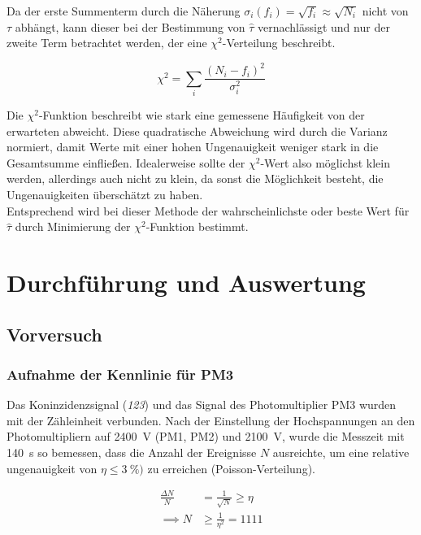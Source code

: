 \documentclass[slug=LM, room=Andreas-Schubert-Bau\,\ K\ 1A, supervisor=Anne-Sophie\ Berthold, coursedate=13.\ 12.\ 2019]{../../Lab_Report_LaTeX/lab_report}
\begin{document}
Da der erste Summenterm durch die Näherung \(\sigma_i(f_i) = \sqrt{f_i} \approx \sqrt{N_i}\) nicht
von \(\tau\) abhängt, kann dieser bei der Bestimmung von \(\hat{\tau}\) vernachlässigt und nur
der zweite Term betrachtet werden, der eine \(\chi^2\)-Verteilung beschreibt.

\begin{equation}\label{eq:chi}
 \chi^2 = \sum_{i} \frac{(N_i - f_i)^2}{\sigma_i^2}
\end{equation}

Die \(\chi^2\)-Funktion beschreibt wie stark eine gemessene Häufigkeit von der erwarteten abweicht.
Diese quadratische Abweichung wird durch die Varianz normiert, damit Werte mit einer hohen
Ungenauigkeit weniger stark in die Gesamtsumme einfließen. Idealerweise sollte der \(\chi^2\)-Wert
also möglichst klein werden, allerdings auch nicht zu klein, da sonst die Möglichkeit besteht, die
Ungenauigkeiten überschätzt zu haben.\\

Entsprechend wird bei dieser Methode der wahrscheinlichste oder beste Wert für \(\hat\tau\) durch
Minimierung der \(\chi^2\)-Funktion bestimmt.

\section{Durchf\"uhrung und Auswertung}
\label{sec:durchaus}

\subsection{Vorversuch}
\label{sec:vorvers}

\subsubsection{Aufnahme der Kennlinie f\"ur PM3}
\label{sec:pm3kenn}

Das Koninzidenzsignal (\textit{123}) und das Signal des
Photomultiplier PM3 wurden mit der Z\"ahleinheit verbunden.  Nach der
Einstellung der Hochspannungen an den Photomultipliern auf
\SI{2400}{\volt} (PM1, PM2) und \SI{2100}{\volt}, wurde die Messzeit
mit \SI{140}{\second} so bemessen, dass die Anzahl der Ereignisse
\(N\) ausreichte, um eine relative ungenauigkeit von
\(\eta \leq \SI{3}{\percent})\) zu erreichen (Poisson-Verteilung).

\begin{align}
\label{eq:mtime}
\frac{\Delta N}{N} &= \frac{1}{\sqrt{N}} \geq \eta \\
\implies N &\geq \frac{1}{\eta^2} = 1111
\end{align}
\end{document}
